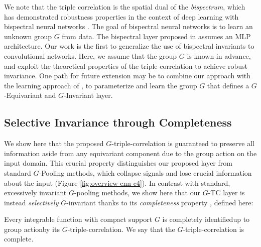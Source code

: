 

We note that the triple correlation is the spatial dual of the \textit{bispectrum}, which has demonstrated robustness properties in the context of deep learning with bispectral neural networks \cite{sanborn2023bispectral}. The goal of bispectral neural networks is to learn an unknown group $G$ from data. The bispectral layer proposed in \cite{sanborn2023bispectral} assumes an MLP architecture. Our work is the first to generalize the use of bispectral invariants to convolutional networks. Here, we assume that the group $G$ is known in advance, and exploit the theoretical properties of the triple correlation to achieve robust invariance. One path for future extension may be to combine our approach with the learning approach of \cite{sanborn2023bispectral}, to parameterize and learn the group $G$ that defines a $G$-Equivariant and $G$-Invariant layer.

\subsection{Selective Invariance through Completeness}

We show here that the proposed $G$-triple-correlation is guaranteed to preserve all information aside from any equivariant component due to the group action on the input domain. This crucial property distinguishes our proposed layer from standard $G$-Pooling methods, which collapse signals and lose crucial information about the input (Figure \ref{fig:overview-cnn-c4}). In contrast with standard, excessively invariant $G$-pooling methods, we show here that our $G$-TC layer is instead \textit{selectively} $G$-invariant thanks to its \textit{completeness} property \cite{yellott1992uniqueness, kakarala1993group, kakarala2012bispectrum}, defined here:


\begin{proposition}
    Every integrable function with compact support $G$ is completely identified\textemdash up to group action\textemdash by its $G$-triple-correlation. We say that the $G$-triple-correlation is complete.
\end{proposition}

